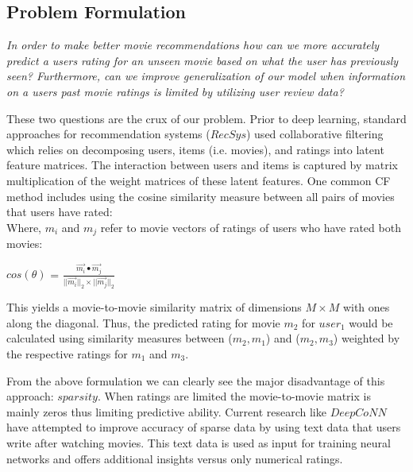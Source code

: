 \documentclass[10pt, twocolumn, letterpaper]{article}
\begin{document}
\subsection{Problem Formulation}

\textit{In order to make better movie recommendations how can we more accurately predict a users rating for an unseen movie based on what the user has previously seen? Furthermore, can we improve generalization of our model when information on a users past movie ratings is limited by utilizing user review data?}\newline

These two questions are the crux of our problem. Prior to deep learning, standard approaches for recommendation systems ($RecSys$) used collaborative filtering which relies on decomposing users, items (i.e. movies), and ratings into latent feature matrices. The interaction between users and items is captured by matrix multiplication of the weight matrices of these latent features. One common CF method includes using the cosine similarity measure between all pairs of movies that users have rated:\\

Where,
$m_{i}$ and $m_{j}$ refer to movie vectors of ratings of users who have rated both movies:

\begin{center}
\textbf{$cos(\theta)$} =
$\frac{\vec{m_{i}} \bullet \vec{m_{j}}}{||\vec{m_{i}}||_2 \times ||\vec{m_{j}}||_2}$
\end{center}

This yields a movie-to-movie similarity matrix of dimensions $M \times M$ with ones along the diagonal. Thus, the predicted rating for movie $m_{2}$ for $user_1$ would be calculated using similarity measures between ($m_2,m_1$) and ($m_2,m_3$) weighted by the respective ratings for $m_1$ and $m_3$.

From the above formulation we can clearly see the major disadvantage of this approach: $sparsity$. When ratings are limited the movie-to-movie matrix is mainly zeros thus limiting predictive ability. Current research like $DeepCoNN$ have attempted to improve accuracy of sparse data by using text data that users write after watching movies. This text data is used as input for training neural networks and offers additional insights versus only numerical ratings.
\end{document}

